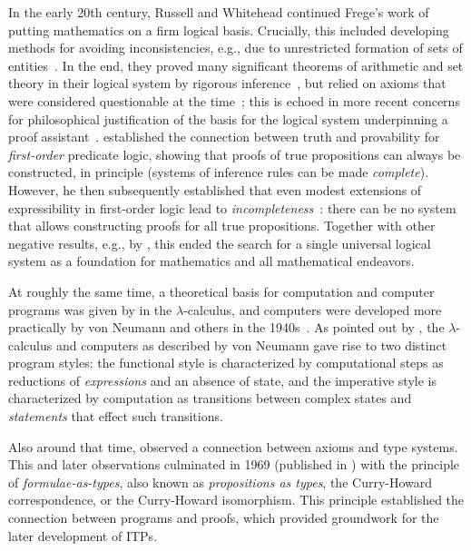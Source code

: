 In the early 20th century, Russell and Whitehead continued Frege's work of putting mathematics on a firm logical basis. Crucially, this included developing methods for avoiding inconsistencies, e.g., due to unrestricted formation of sets of entities~\citep{Russell1918}. In the end, they proved many significant theorems of arithmetic and set theory in their logical system by rigorous inference~\citep{Whitehead1997}, but relied on axioms that were considered questionable at the time~\citep{sep-principia-mathematica}; this is echoed in more recent concerns for philosophical justification of the basis for the logical system underpinning a proof assistant~\citep{Barras2010}.
\citet{Goedel1930} established the connection between truth and provability for \emph{first-order} predicate logic, showing that proofs of true propositions can always be constructed, in principle (systems of inference rules can be made \emph{complete}). However, he then subsequently established that even modest extensions of expressibility in first-order logic lead to \emph{incompleteness}~\citep{Goedel1931}: there can be no system that allows constructing proofs for all true propositions. Together with other negative results, e.g., by \cite{Tarski1936}, this ended the search for a single universal logical system as a foundation for mathematics and all mathematical endeavors.

At roughly the same time, a theoretical basis for computation and computer programs was given by \cite{Church1936} in the $\lambda$-calculus, and computers were developed more practically by von Neumann and others in the 1940s~\citep{vonNeumann1993}. As pointed out by \cite{Backus1978}, the $\lambda$-calculus and computers as described by von Neumann gave rise to two distinct program styles: the functional style is characterized by computational steps as reductions of \emph{expressions} and an absence of state, and the imperative style is characterized by computation as transitions between complex states and \emph{statements} that effect such transitions.

Also around that time, \cite{Curry1934} observed a connection between axioms and type systems.
This and later observations culminated in 1969 (published in \cite{Howard1980}) with the principle of \emph{formulae-as-types},
also known as \emph{propositions as types}, the Curry-Howard correspondence, or the Curry-Howard isomorphism.
This principle established the connection between programs and proofs, which provided groundwork for the
later development of ITPs.

